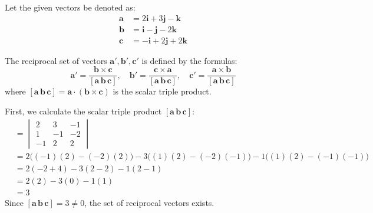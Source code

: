 \documentclass[12pt,a4paper]{article}
\begin{document}
\begin{enumerate}
\begin{tcolorbox}[enhanced,breakable,ansbox,colback=cD!4,colframe=cD,boxrule=0.8pt,arc=5pt,title={\textbf{Answer}},fonttitle=\bfseries\color{white},colbacktitle=cD]
Let the given vectors be denoted as:
\begin{align*}
    \mathbf{a} &= 2\mathbf{i} + 3\mathbf{j} - \mathbf{k} \\
    \mathbf{b} &= \mathbf{i} - \mathbf{j} - 2\mathbf{k} \\
    \mathbf{c} &= -\mathbf{i} + 2\mathbf{j} + 2\mathbf{k}
\end{align*}

The reciprocal set of vectors $\mathbf{a}', \mathbf{b}', \mathbf{c}'$ is defined by the formulas:
\[ \mathbf{a}' = \frac{\mathbf{b} \times \mathbf{c}}{[\mathbf{a}\,\mathbf{b}\,\mathbf{c}]}, \quad \mathbf{b}' = \frac{\mathbf{c} \times \mathbf{a}}{[\mathbf{a}\,\mathbf{b}\,\mathbf{c}]}, \quad \mathbf{c}' = \frac{\mathbf{a} \times \mathbf{b}}{[\mathbf{a}\,\mathbf{b}\,\mathbf{c}]} \]
where $[\mathbf{a}\,\mathbf{b}\,\mathbf{c}] = \mathbf{a} \cdot (\mathbf{b} \times \mathbf{c})$ is the scalar triple product.

First, we calculate the scalar triple product $[\mathbf{a}\,\mathbf{b}\,\mathbf{c}]$:
\begin{align*}
    [\mathbf{a}\,\mathbf{b}\,\mathbf{c}] &= \begin{vmatrix}
        2 & 3 & -1 \\
        1 & -1 & -2 \\
        -1 & 2 & 2
    \end{vmatrix} \\[1em]
    &= 2\big((-1)(2) - (-2)(2)\big) - 3\big((1)(2) - (-2)(-1)\big) - 1\big((1)(2) - (-1)(-1)\big) \\
    &= 2(-2 + 4) - 3(2 - 2) - 1(2 - 1) \\
    &= 2(2) - 3(0) - 1(1) \\
    &= 3
\end{align*}
Since $[\mathbf{a}\,\mathbf{b}\,\mathbf{c}] = 3 \neq 0$, the set of reciprocal vectors exists.


\end{tcolorbox}
\end{enumerate}
\end{document}
